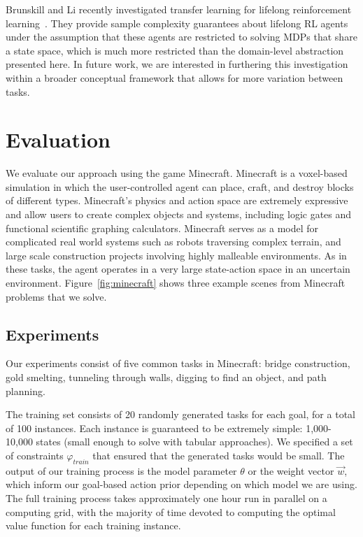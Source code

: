 \documentclass[11pt]{article}
\begin{document}
Brunskill and Li recently investigated transfer learning for lifelong reinforcement learning~\cite{brunskill2014pac,brunskill2013sample}. They provide sample complexity guarantees about lifelong RL agents under the assumption that these agents are restricted to solving MDPs that share a state space, which is much more restricted than the domain-level abstraction presented here. In future work, we are interested in furthering this investigation within a broader conceptual framework that allows for more variation between tasks.

\section{Evaluation}
\label{sec:evaluation}

We evaluate our approach using the game Minecraft. Minecraft is a voxel-based simulation in which the user-controlled agent can place, craft, and destroy blocks of different types.
Minecraft's physics and action space are extremely expressive and allow users to create complex objects and systems, including logic gates and functional scientific graphing calculators.
Minecraft serves as a model for complicated real world systems such as robots traversing complex terrain, and large scale construction projects involving highly malleable environments.  As in these tasks, the agent operates in a very large state-action space in an uncertain environment. Figure~\ref{fig:minecraft} shows three example scenes from Minecraft problems that we solve.

\subsection{Experiments}
Our experiments consist of five common tasks in Minecraft:
bridge construction, gold smelting, tunneling through
walls, digging to find an object, and path planning.

The training set consists of 20 randomly generated tasks for each goal, for a total of 100 instances. Each instance is guaranteed to be extremely simple: 1,000-10,000 states (small enough to solve with tabular approaches). We specified a set of constraints $\varphi_{train}$ that ensured that the generated tasks would be small. The output of our training process is the model parameter $\theta$ or the weight vector $\vec{w}$, which inform our goal-based action prior depending on which model we are using. The full training process takes approximately one hour run in parallel on a computing grid, with the majority of time devoted to computing the optimal value function for each training instance.
\end{document}
